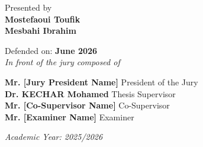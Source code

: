 \begin{titlepage}
\normalsize Presented by\\
{\normalsize \textbf{Mostefaoui Toufik}}\\
{\normalsize \textbf{Mesbahi Ibrahim}}\\

\vspace{0.2cm}

{\normalsize Defended on: \textbf{June 2026}}\\
{\normalsize \textit{In front of the jury composed of}}\\

\vspace{0.2cm}

\begin{center}
    {\normalsize \textbf{Mr. [Jury President Name]} \hfill President of the Jury}\\
    {\normalsize \textbf{Dr. KECHAR Mohamed} \hfill Thesis Supervisor}\\
    {\normalsize \textbf{Mr. [Co-Supervisor Name]} \hfill Co-Supervisor}\\
    {\normalsize \textbf{Mr. [Examiner Name]} \hfill Examiner}\\
\end{center}

\vspace{0.5cm}

\normalsize \textit{Academic Year: 2025/2026}
\end{titlepage}
